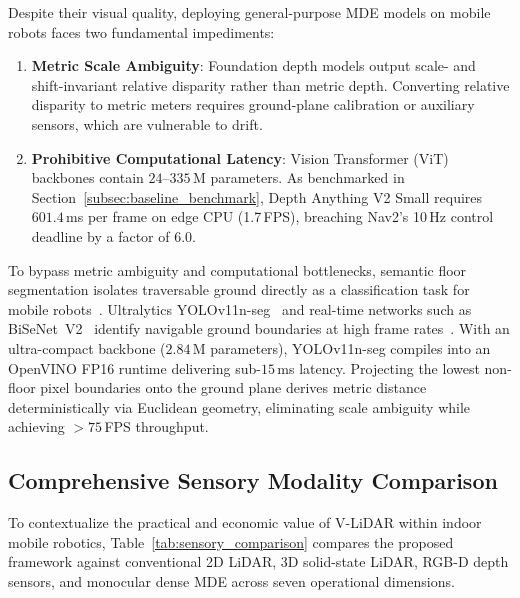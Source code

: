 \documentclass{ieeeaccess}
\begin{document}
Despite their visual quality, deploying general-purpose MDE models on mobile robots faces two fundamental impediments:
\begin{enumerate}
  \item \textbf{Metric Scale Ambiguity}: Foundation depth models output scale- and shift-invariant relative disparity rather than metric depth. Converting relative disparity to metric meters requires ground-plane calibration or auxiliary sensors, which are vulnerable to drift.
  \item \textbf{Prohibitive Computational Latency}: Vision Transformer (ViT) backbones contain $24\text{--}335$\,M parameters. As benchmarked in Section~\ref{subsec:baseline_benchmark}, Depth Anything V2 Small requires $601.4$\,ms per frame on edge CPU (1.7\,FPS), breaching Nav2's 10\,Hz control deadline by a factor of 6.0.
\end{enumerate}

To bypass metric ambiguity and computational bottlenecks, semantic floor segmentation isolates traversable ground directly as a classification task for mobile robots~\cite{sevastopoulos2022survey,hyun2022street}. Ultralytics YOLOv11n-seg~\cite{ultralytics_2024_ultralytics} and real-time networks such as BiSeNet~V2~\cite{yu2021bisenetv2} identify navigable ground boundaries at high frame rates~\cite{wang2023realtime}. With an ultra-compact backbone ($2.84$\,M parameters), YOLOv11n-seg compiles into an OpenVINO FP16 runtime delivering sub-$15$\,ms latency. Projecting the lowest non-floor pixel boundaries onto the ground plane derives metric distance deterministically via Euclidean geometry, eliminating scale ambiguity while achieving $>75$\,FPS throughput.

\subsection{Comprehensive Sensory Modality Comparison}
\label{subsec:sensory_comparison}

To contextualize the practical and economic value of V-LiDAR within indoor mobile robotics, Table~\ref{tab:sensory_comparison} compares the proposed framework against conventional 2D LiDAR, 3D solid-state LiDAR, RGB-D depth sensors, and monocular dense MDE across seven operational dimensions.
\end{document}
